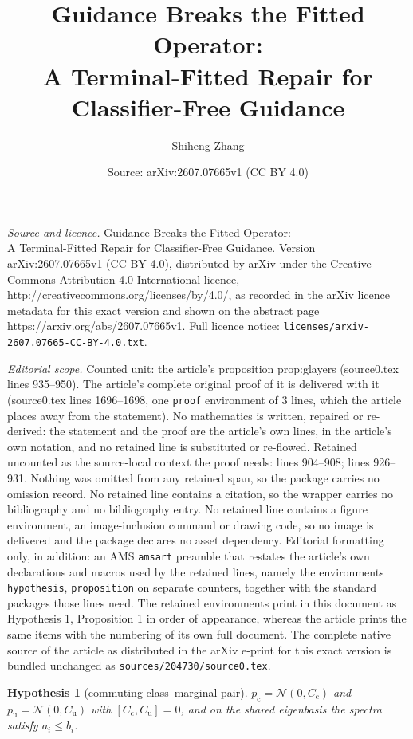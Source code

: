 \documentclass[10pt,a4paper]{amsart}
\title{Guidance Breaks the Fitted Operator:\\ A Terminal-Fitted Repair for Classifier-Free Guidance}
\author{Shiheng Zhang}
\date{Source: arXiv:2607.07665v1 (CC BY 4.0)}
\newtheorem{hypothesis}{Hypothesis}
\begin{document}
\maketitle

\noindent\emph{Source and licence.} Guidance Breaks the Fitted Operator:\\ A Terminal-Fitted Repair for Classifier-Free Guidance. Version arXiv:2607.07665v1 (CC BY 4.0), distributed by arXiv under the Creative Commons Attribution 4.0 International licence, http://creativecommons.org/licenses/by/4.0/, as recorded in the arXiv licence metadata for this exact version and shown on the abstract page https://arxiv.org/abs/2607.07665v1. Full licence notice: \texttt{licenses/arxiv-2607.07665-CC-BY-4.0.txt}.\par\smallskip

\noindent\textit{Editorial scope.} Counted unit: the article's proposition prop:glayers (source0.tex lines 935--950). The article's complete original proof of it is delivered with it (source0.tex lines 1696--1698, one \texttt{proof} environment of 3 lines, which the article places away from the statement). No mathematics is written, repaired or re-derived: the statement and the proof are the article's own lines, in the article's own notation, and no retained line is substituted or re-flowed.  Retained uncounted as the source-local context the proof needs: lines 904--908; lines 926--931.  Nothing was omitted from any retained span, so the package carries no omission record.  No retained line contains a citation, so the wrapper carries no bibliography and no bibliography entry.  No retained line contains a figure environment, an image-inclusion command or drawing code, so no image is delivered and the package declares no asset dependency.  Editorial formatting only, in addition: an AMS \texttt{amsart} preamble that restates the article's own declarations and macros used by the retained lines, namely the environments \texttt{hypothesis}, \texttt{proposition} on separate counters, together with the standard packages those lines need.  The retained environments print in this document as Hypothesis 1, Proposition 1 in order of appearance, whereas the article prints the same items with the numbering of its own full document.  The complete native source of the article as distributed in the arXiv e-print for this exact version is bundled unchanged as \texttt{sources/204730/source0.tex}.
\begin{hypothesis}[commuting class--marginal pair]\label{hyp:commuting}
$p_{\mathrm c} = \mathcal N(0, C_{\mathrm c})$ and $p_{\mathrm u} =
\mathcal N(0, C_{\mathrm u})$ with $[C_{\mathrm c}, C_{\mathrm u}] = 0$,
and on the shared eigenbasis the spectra satisfy $a_i \le b_i$.
\end{hypothesis}
\end{document}
